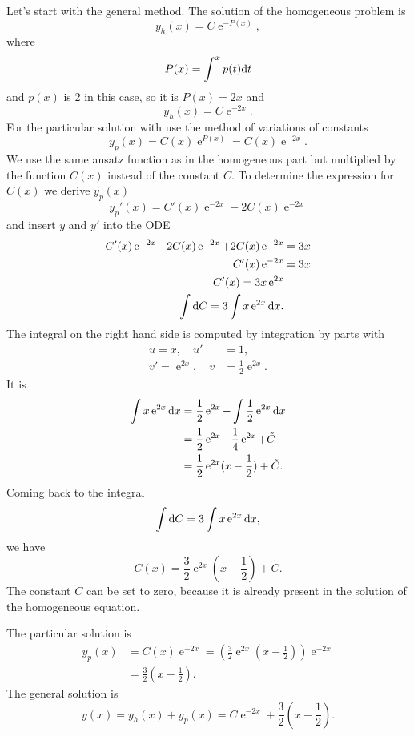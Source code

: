 {\begin{itemize}
Let's start with the general method. The solution of the homogeneous problem is
$$
y_h(x) = C \operatorname{e}^{-P(x)},
$$
where 
$$
P(x) = \int^x p(t) \mathrm{d} t
$$
and $p(x)$ is 2 in this case, so it is $P(x) = 2x$ and
$$
y_h(x) = C\operatorname{e}^{-2x}.
$$
For the particular solution with use the method of variations of constants
$$
y_p(x) = C(x) \operatorname{e}^{P(x)} = C(x) \operatorname{e}^{-2x}.
$$
We use the same ansatz function as in the homogeneous part but multiplied by the function $C(x)$ instead of the constant $C$.
To determine the expression for $C(x)$ we derive $y_p(x)$
$$
y_p'(x) = C'(x) \operatorname{e}^{-2x} -2 C(x) \operatorname{e}^{-2x}
$$
and insert $y$ and $y'$ into the ODE
\begin{align*}
C'(x) \operatorname{e}^{-2x} -2 C(x) \operatorname{e}^{-2x} + 2 C(x) \operatorname{e}^{-2x} &= 3x\\
C'(x) \operatorname{e}^{-2x} &= 3x\\
C'(x) = 3x \operatorname{e}^{2x}\\
\int \mathrm{d} C = 3 \int x \operatorname{e}^{2x} \mathrm{d} x.
\end{align*}
The integral on the right hand side is computed by integration by parts with
\begin{align*}
u=x, \quad u'&=1,\\
v'=\operatorname{e}^{2x}, \quad v&=\frac{1}{2}\operatorname{e}^{2x}.
\end{align*}
It is
\begin{align*}
\int x \operatorname{e}^{2x} \mathrm{d} x &= \frac{1}{2} \operatorname{e}^{2x} - \int \frac{1}{2} \operatorname{e}^{2x} \mathrm{d} x\\
&= \frac{1}{2} \operatorname{e}^{2x} - \frac{1}{4} \operatorname{e}^{2x} + \tilde C\\
&= \frac{1}{2}\operatorname{e}^{2x} ( x - \frac{1}{2}) + \tilde C.
\end{align*}
Coming back to the integral
$$
\int \mathrm{d} C = 3 \int x \operatorname{e}^{2x} \mathrm{d} x,
$$
we have
$$
C(x) = \frac{3}{2} \operatorname{e}^{2x} (x-\frac{1}{2}) + \tilde C.
$$
The constant $\tilde C$ can be set to zero, because it is already present in the solution of the homogeneous equation. 

The particular solution is
\begin{align*}
y_p(x) &= C(x) \operatorname{e}^{-2x} = \left( \frac{3}{2} \operatorname{e}^{2x} (x-\frac{1}{2})\right) \operatorname{e}^{-2x}\\
&=\frac{3}{2} (x-\frac{1}{2}).
\end{align*}
The general solution is
$$
y(x) = y_h(x) + y_p(x) = C \operatorname{e}^{-2x} + \frac{3}{2} (x-\frac{1}{2}).
$$


\end{itemize}}
